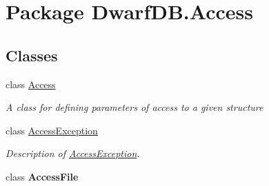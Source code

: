 \hypertarget{namespace_dwarf_d_b_1_1_access}{\section{Package Dwarf\+D\+B.\+Access}
\label{namespace_dwarf_d_b_1_1_access}
}
\subsection*{Classes}
\begin{DoxyCompactItemize}
\item 
class \hyperlink{class_dwarf_d_b_1_1_access_1_1_access}{Access}
\begin{DoxyCompactList}\small\item\em A class for defining parameters of access to a given structure \end{DoxyCompactList}\item 
class \hyperlink{class_dwarf_d_b_1_1_access_1_1_access_exception}{Access\+Exception}
\begin{DoxyCompactList}\small\item\em Description of \hyperlink{class_dwarf_d_b_1_1_access_1_1_access_exception}{Access\+Exception}. \end{DoxyCompactList}\item 
class {\bfseries Access\+File}
\end{DoxyCompactItemize}
